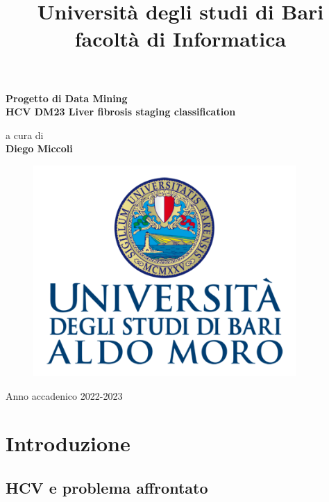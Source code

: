 \documentclass[italian,12pt,a4paper]{article}
\title{Università degli studi di Bari facoltà di Informatica}
\date{} %
\begin{document}
	\maketitle
	\thispagestyle{empty}
	\begin{center}
		\huge	\textbf{Progetto di Data Mining} \\
		\Large \textbf{HCV DM23 Liver fibrosis staging classification}
	\end{center}
	
	
	
	\begin{center}
		a cura di \\
		\Large \textbf{Diego Miccoli}
	\end{center}

	
	\begin{figure}[hb]
		\centering
		\includegraphics[width=10cm]{logoUNIlatex.png}
	\end{figure}
	
	\vfill
	\begin{center}
		Anno accadenico 2022-2023
	\end{center}
	
	\newpage
	
	\tableofcontents

	\newpage

	
	\section{Introduzione}

	\subsection{HCV e problema affrontato}
\end{document}
